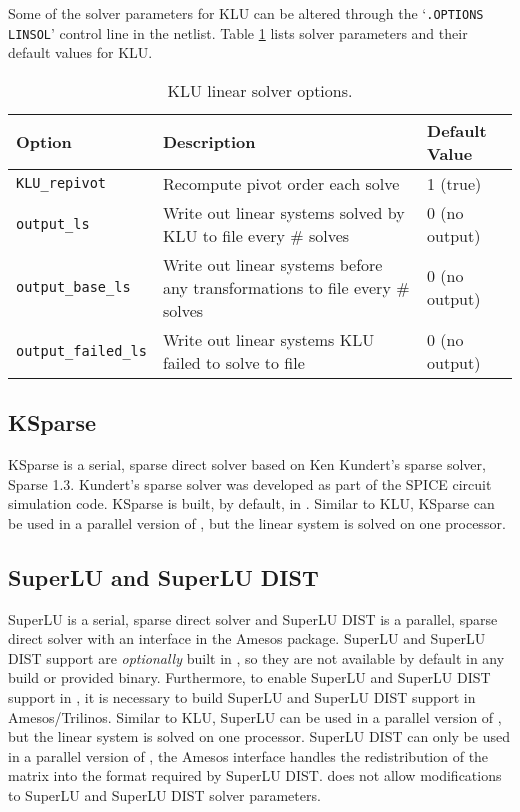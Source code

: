 Some of the solver parameters for KLU can be altered through the `\texttt{.OPTIONS LINSOL}' control line in the netlist.  
Table \ref{tab:klu:options} lists solver parameters and their default values for KLU.
   
\begin{table}[htp]
\caption[ KLU linear solver options.] {KLU linear solver options.}
\label{tab:klu:options}
\begin{center}
\begin{tabular}{| p{3.5cm} | p{9cm} | p{2.5cm} |}
\hline
Option & Description & Default Value \\
\hline
{\tt KLU\_repivot}         & Recompute pivot order each solve & 1 (true) \\
{\tt output\_ls}           & Write out linear systems solved by KLU to file every \# solves & 0 (no output)\\
{\tt output\_base\_ls}     & Write out linear systems before any transformations to file every \# solves & 0 (no output)\\
{\tt output\_failed\_ls}   & Write out linear systems KLU failed to solve to file & 0 (no output) \\
\hline
\end{tabular}
\end{center}
\end{table}

\subsection{KSparse}
KSparse is a serial, sparse direct solver based on Ken Kundert's sparse solver, Sparse 1.3.  Kundert's sparse solver was developed 
as part of the SPICE circuit simulation code.  KSparse is built, by default, in \Xyce{}.  Similar to KLU,
KSparse can be used in a parallel version of \Xyce{}, but the linear system is solved on one processor.

\subsection{SuperLU and SuperLU DIST}
SuperLU is a serial, sparse direct solver and SuperLU DIST is a parallel, sparse direct solver with an interface in the 
Amesos package.  SuperLU and SuperLU DIST support are {\it optionally} built in \Xyce{},
so they are not available by default in any \Xyce{} build or provided binary.  Furthermore, to enable SuperLU and 
SuperLU DIST support in \Xyce{}, it is necessary to build SuperLU and SuperLU DIST support in Amesos/Trilinos.  Similar to KLU, 
SuperLU can be used in a parallel version of \Xyce{}, but the linear system is 
solved on one processor.  SuperLU DIST can only be used in a parallel version of \Xyce{}, the Amesos interface handles the redistribution
of the matrix into the format required by SuperLU DIST.  
\Xyce{} does not allow modifications to SuperLU and SuperLU DIST solver parameters. 


